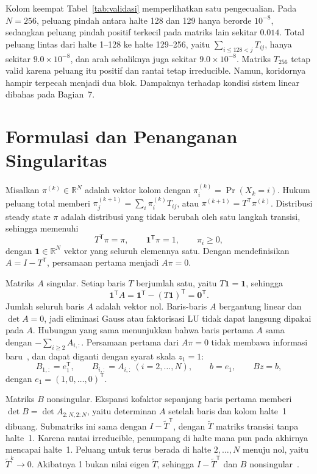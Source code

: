 \documentclass[12pt,a4paper]{article}
\newcommand{\R}{\mathbb{R}}
\newcommand{\T}{\mathsf{T}}
\numberwithin{equation}{section}
\begin{document}
Kolom keempat Tabel~\ref{tab:validasi} memperlihatkan satu pengecualian. Pada $N=256$, peluang pindah antara halte 128
dan 129 hanya berorde $10^{-8}$, sedangkan peluang pindah positif terkecil pada matriks lain sekitar $0.014$. Total
peluang lintas dari halte 1--128 ke halte 129--256, yaitu $\sum_{i\le128<j}T_{ij}$, hanya sekitar
$9.0\times10^{-8}$, dan arah sebaliknya juga sekitar $9.0\times10^{-8}$. Matriks $T_{256}$ tetap valid karena peluang
itu positif dan rantai tetap irreducible. Namun, koridornya hampir terpecah menjadi dua blok. Dampaknya terhadap
kondisi sistem linear dibahas pada Bagian~7.

\section{Formulasi dan Penanganan Singularitas}\label{sec:formulasi}
Misalkan $\pi^{(k)}\in\R^N$ adalah vektor kolom dengan $\pi^{(k)}_i=\Pr(X_k=i)$. Hukum peluang total memberi
$\pi^{(k+1)}_j=\sum_{i}\pi^{(k)}_i T_{ij}$, atau $\pi^{(k+1)}=T^\T\pi^{(k)}$. Distribusi steady state
$\pi$ adalah distribusi yang tidak berubah oleh satu langkah transisi, sehingga memenuhi
\begin{equation}\label{eq:steady}
T^\T\pi=\pi,\qquad \mathbf1^\T\pi=1,\qquad \pi_i\ge0,
\end{equation}
dengan $\mathbf1\in\R^N$ vektor yang seluruh elemennya satu. Dengan mendefinisikan $A=I-T^\T$, persamaan pertama
menjadi $A\pi=0$.

Matriks $A$ singular. Setiap baris $T$ berjumlah satu, yaitu $T\mathbf1=\mathbf1$, sehingga
\[
\mathbf1^\T A=\mathbf1^\T-(T\mathbf1)^\T=\mathbf0^\T .
\]
Jumlah seluruh baris $A$ adalah vektor nol. Baris-baris $A$ bergantung linear dan $\det A=0$, jadi eliminasi Gauss
atau faktorisasi LU tidak dapat langsung dipakai pada $A$. Hubungan yang sama menunjukkan bahwa baris pertama $A$
sama dengan $-\sum_{i\ge2}A_{i,:}$. Persamaan pertama dari $A\pi=0$ tidak membawa informasi baru~\cite{stewart}, dan
dapat diganti dengan syarat skala $z_1=1$:
\begin{equation}\label{eq:B}
B_{1,:}=e_1^\T,\qquad B_{i,:}=A_{i,:}\ (i=2,\dots,N),\qquad b=e_1,\qquad Bz=b,
\end{equation}
dengan $e_1=(1,0,\dots,0)^\T$.

Matriks $B$ nonsingular. Ekspansi kofaktor sepanjang baris pertama memberi $\det B=\det A_{2:N,2:N}$, yaitu
determinan $A$ setelah baris dan kolom halte~1 dibuang. Submatriks ini sama dengan $I-\widetilde T^\T$, dengan
$\widetilde T$ matriks transisi tanpa halte~1. Karena rantai irreducible, penumpang di halte mana pun pada akhirnya
mencapai halte~1. Peluang untuk terus berada di halte $2,\dots,N$ menuju nol, yaitu $\widetilde T^k\to0$. Akibatnya
1 bukan nilai eigen $\widetilde T$, sehingga $I-\widetilde T^\T$ dan $B$ nonsingular~\cite{stewart}.
\end{document}

